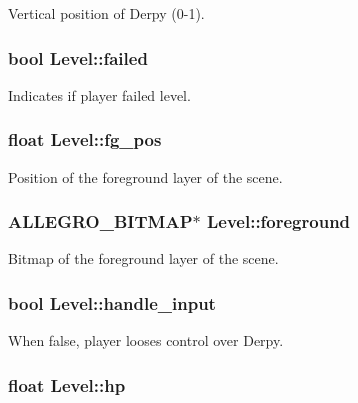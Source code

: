 \-Vertical position of \-Derpy (0-\/1). \hypertarget{structLevel_a5bea34b31777260f1b23a1d64e6cd865}{
\subsubsection[{failed}]{\setlength{\rightskip}{0pt plus 5cm}bool {\bf \-Level\-::failed}}}\label{structLevel_a5bea34b31777260f1b23a1d64e6cd865}
\-Indicates if player failed level. \hypertarget{structLevel_a665bb93951ab6b7a91543712152a3acf}{
\subsubsection[{fg\-\_\-pos}]{\setlength{\rightskip}{0pt plus 5cm}float {\bf \-Level\-::fg\-\_\-pos}}}\label{structLevel_a665bb93951ab6b7a91543712152a3acf}
\-Position of the foreground layer of the scene. \hypertarget{structLevel_a26c758ccdc7404a3ee0e766d1cbbf0be}{
\subsubsection[{foreground}]{\setlength{\rightskip}{0pt plus 5cm}\-A\-L\-L\-E\-G\-R\-O\-\_\-\-B\-I\-T\-M\-A\-P$\ast$ {\bf \-Level\-::foreground}}}\label{structLevel_a26c758ccdc7404a3ee0e766d1cbbf0be}
\-Bitmap of the foreground layer of the scene. \hypertarget{structLevel_a06cf4f2da517284d2006540051d3e5c0}{
\subsubsection[{handle\-\_\-input}]{\setlength{\rightskip}{0pt plus 5cm}bool {\bf \-Level\-::handle\-\_\-input}}}\label{structLevel_a06cf4f2da517284d2006540051d3e5c0}
\-When false, player looses control over \-Derpy. \hypertarget{structLevel_a49df009e8113251cfcb48fe17df0b571}{
\subsubsection[{hp}]{\setlength{\rightskip}{0pt plus 5cm}float {\bf \-Level\-::hp}}}\label{structLevel_a49df009e8113251cfcb48fe17df0b571}
